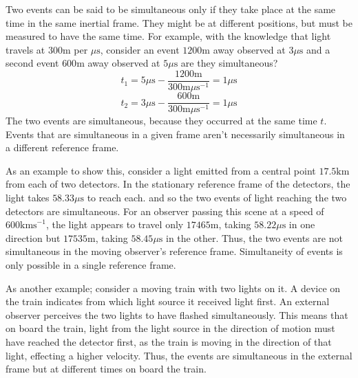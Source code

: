 \documentclass[12pt]{report}
\begin{document}
\begin{flushleft}
\bigskip
Two events can be said to be simultaneous only if they take place at the same
time in the same inertial frame. They might be at different positions, but must
be measured to have the same time. For example, with the knowledge that light
travels at \(300\mathrm{m}\) per \(\mu\mathrm{s}\), consider an event 
\(1200\mathrm{m}\) away observed at \(3\mu\mathrm{s}\) and a second event 
\(600\mathrm{m}\) away observed at \(5\mu\mathrm{s}\) are they 
simultaneous?
\[t_1 = 5\mu\mathrm{s} - \frac{1200\mathrm{m}}{300\mathrm{m}\mu\mathrm{s^{-1}}}
= 1\mu\mathrm{s}\]
\[t_2 = 3\mu\mathrm{s} - \frac{600\mathrm{m}}{300\mathrm{m}\mu\mathrm{s^{-1}}}
= 1\mu\mathrm{s}\]
The two events are simultaneous, because they occurred at the same time \(t\).
Events that are simultaneous in a given frame aren't necessarily simultaneous 
in a different reference frame.

\bigskip
As an example to show this, consider a light emitted from a central point 
\(17.5\mathrm{km}\) from each of two detectors. In the stationary reference
frame of the detectors, the light takes \(58.33\mu\mathrm{s}\) to reach each.
and so the two events of light reaching the two detectors are simultaneous.
For an observer passing this scene at a speed of \(600\mathrm{kms}^{-1}\), the
light appears to travel only \(17465\mathrm{m}\), taking \(58.22\mu\mathrm{s}\)
in one direction but \(17535\mathrm{m}\), taking \(58.45\mu\mathrm{s}\) in the
other. Thus, the two events are not simultaneous in the moving observer's
reference frame. Simultaneity of events is only possible in a single reference
frame.

\bigskip
As another example; consider a moving train with two lights on it. A device on
the train indicates from which light source it received light first. An 
external observer perceives the two lights to have flashed simultaneously. This
means that on board the train, light from the light source in the direction
of motion must have reached the detector first, as the train is moving in the
direction of that light, effecting a higher velocity. Thus, the events are 
simultaneous in the external frame but at different times on board the train.

\end{flushleft}
\end{document}
